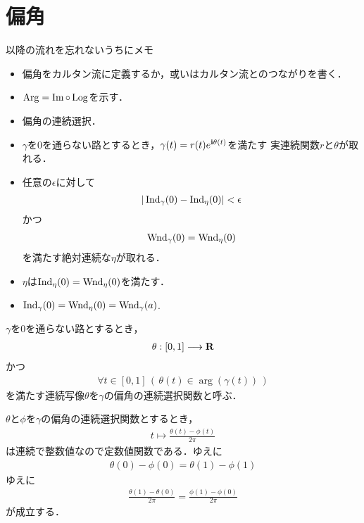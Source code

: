 \section{偏角}
	\begin{itembox}[l]{以降の流れを忘れないうちにメモ}
		\begin{itemize}
			\item 偏角をカルタン流に定義するか，或いはカルタン流とのつながりを書く．
			\item $\operatorname{Arg} = \operatorname{Im} \circ \operatorname{Log}$を示す．
			\item 偏角の連続選択．
			\item $\gamma$を$0$を通らない路とするとき，$\gamma(t) = r(t) e^{\mathbf{i} \theta(t)}$を満たす
				実連続関数$r$と$\theta$が取れる．
			\item 任意の$\epsilon$に対して
				\begin{align}
					|\operatorname{Ind}_{\gamma}(0) - \operatorname{Ind}_{\eta}(0)| < \epsilon
				\end{align}
				かつ
				\begin{align}
					\operatorname{Wnd}_{\gamma}(0) = \operatorname{Wnd}_{\eta}(0)
				\end{align}
				を満たす絶対連続な$\eta$が取れる．
			\item $\eta$は$\operatorname{Ind}_{\eta}(0) = \operatorname{Wnd}_{\eta}(0)$を満たす．
			\item $\operatorname{Ind}_\gamma(0) = \operatorname{Wnd}_{\eta}(0) = \operatorname{Wnd}_{\gamma}(a)$.
		\end{itemize}
	\end{itembox}
	
	$\gamma$を$0$を通らない路とするとき，
	\begin{align}
		\theta:[0,1] \longrightarrow \mathbf{R}
	\end{align}
	かつ
	\begin{align}
		\forall t \in [0,1]\, \left(\, \theta(t) \in \arg{(\gamma(t))}\, \right)
	\end{align}
	を満たす連続写像$\theta$を$\gamma$の偏角の連続選択関数と呼ぶ．
	
	$\theta$と$\phi$を$\gamma$の偏角の連続選択関数とするとき，
	\begin{align}
		t \longmapsto \frac{\theta(t) - \phi(t)}{2\pi}
	\end{align}
	は連続で整数値なので定数値関数である．ゆえに
	\begin{align}
		\theta(0) - \phi(0) = \theta(1) - \phi(1)
	\end{align}
	ゆえに
	\begin{align}
		\frac{\theta(1) - \theta(0)}{2\pi} = \frac{\phi(1) - \phi(0)}{2\pi}
	\end{align}
	が成立する．
	
